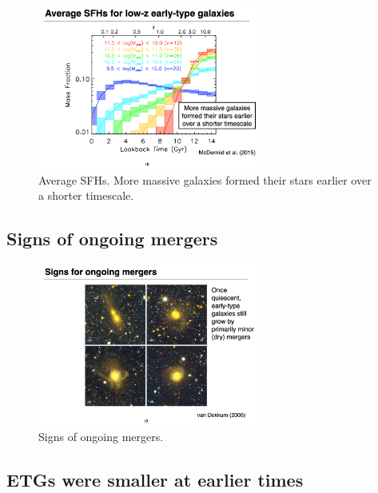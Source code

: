 \documentclass{article}
\begin{document}
\begin{figure}
    \centering
    \includegraphics[width=0.66\textwidth]{figs/Screen Shot 2021-10-20 at 10.47.43 AM.png}
    \caption{Average SFHs. More massive galaxies formed their stars earlier over a shorter timescale. }
    \label{fig:low_z_ETG_SHF}
\end{figure}

\subsection{Signs of ongoing mergers}

\begin{figure}
    \centering
    \includegraphics[width=0.66\textwidth]{figs/Screen Shot 2021-10-20 at 10.49.36 AM.png}
    \caption{Signs of ongoing mergers.}
    \label{fig:ongoing_merger_histories}
\end{figure}


\subsection{ETGs were smaller at earlier times}
\end{document}
